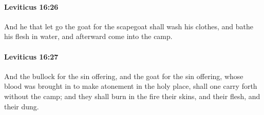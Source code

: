 		\paragraph{Leviticus 16:26} %
			\label{LEVITICUS-16-26}

			And he that let go the goat for the scapegoat shall wash his clothes, and bathe his flesh in water, and afterward come into the camp.


		\paragraph{Leviticus 16:27} %
			\label{LEVITICUS-16-27}

			And the bullock for the sin offering, and the goat for the sin offering, whose blood was brought in to make atonement in the holy place, shall one carry forth without the camp; and they shall burn in the fire their skins, and their flesh, and their dung.

